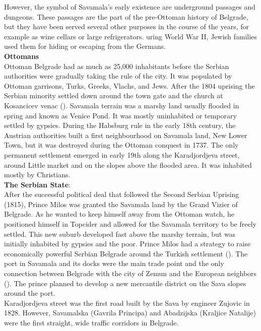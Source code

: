 \documentclass[11pt]{report}
\begin{document}
However, the symbol of Savamala's early existence are underground passages and dungeons. These passages are the part of the pre-Ottoman history of Belgrade, but they have been served several other purposes in the course of the years, for example as wine cellars or large refrigerators. 
uring World War II, Jewish families used them for hiding or escaping from the Germans.
\\
\textbf{Ottomans}
\\
Ottoman Belgrade had as much as 25,000 inhabitants before the Serbian authorities were gradually taking the rule of the city.
It was populated by Ottoman garrisons, Turks, Greeks, Vlachs, and Jews.
After the 1804 uprising the Serbian minority settled down around the town gate and the church at Kosancicev venac (\href{ref}{\citealt{doytchinov_modernization_2015}}).
Savamala terrain was a marshy land usually flooded in spring and known as Venice Pond.
It was mostly uninhabited or temporary settled by gypsies.
During the Habsburg rule in the early 18th century, the Austrian authorities built a first neighbourhood on Savamala land, New Lower Town, but it was destroyed during the Ottoman conquest in 1737. The only permanent settlement emerged in early 19th along the Karadjordjeva street, around Little market and on the slopes above the flooded area. It was inhabited mostly by Christians.
\\
\textbf{The Serbian State}:
\\
After the successful political deal that followed the Second Serbian Uprising (1815), Prince Milos was granted the Savamala land by the Grand Vizier of Belgrade.
As he wanted to keep himself away from the Ottoman watch, he positioned himself in Topcider and allowed for the Savamala territory to be freely settled.
This new suburb developed fast above the marshy terrain, but was initially inhabited by gypsies and the poor.
Prince Milos had a strategy to raise economically powerful Serbian Belgrade around the Turkish settlement (\cite{bureau savamala}).
The port in Savamala and its docks were the main trade point and the only connection between Belgrade with the city of Zemun and the European neighbors (\href{ref}{\citealt{doytchinov_modernization_2015}}).
The prince planned to develop a new mercantile district on the Sava slopes around the port. 
\\
Karadjordjeva street was the first road built by the Sava by engineer Zujovic in 1828.
However, Savamalska (Gavrila Principa) and Abadzijska (Kraljice Natalije) were the first straight, wide traffic corridors in Belgrade.
\end{document}
